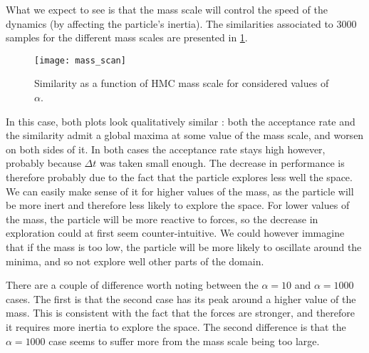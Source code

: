 \documentclass[a4paper, 12pt,oneside]{article}
\begin{document}
			What we expect to see is that the mass scale will control the speed of the dynamics (by affecting the particle's inertia).
			The similarities associated to 3000 samples for the different mass scales are presented in \ref{fig:mass-scan}.
			\begin{figure}[htb]
				\centering
					\vspace{0em}
					\texttt{[image: mass\_scan]}
					\caption{Similarity as a function of HMC mass scale for considered values of $\alpha$.}
					\label{fig:mass-scan}
			\end{figure}
			In this case, both plots look qualitatively similar : both the acceptance rate and the similarity admit a global maxima at some value of the mass scale, and worsen on both sides of it. In both cases the acceptance rate stays high however, probably because $\Delta t$ was taken small enough. The decrease in performance is therefore probably due to the fact that the particle explores less well the space. We can easily make sense of it for higher values of the mass, as the particle will be more inert and therefore less likely to explore the space. For lower values of the mass, the particle will be more reactive to forces, so the decrease in exploration could at first seem counter-intuitive. We could however immagine that if the mass is too low, the particle will be more likely to oscillate around the minima, and so not explore well other parts of the domain.
			
			There are a couple of difference worth noting between the $\alpha=10$ and $\alpha=1000$ cases. The first is that the second case has its peak around a higher value of the mass. This is consistent with the fact that the forces are stronger, and therefore it requires more inertia to explore the space. The second difference is that the $\alpha=1000$ case seems to suffer more from the mass scale being too large.
\end{document}
